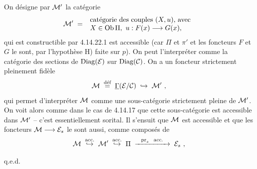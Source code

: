 
On désigne par $\mathcal{M}'$ la catégorie
\[
\mathcal{M}' \;=\;
\begin{array}{l}
\text{catégorie des couples } (X,u)\text{, avec}\\
X \in \operatorname{Ob}\Pi,\ u : F(x) \longrightarrow G(x),
\end{array}
\] %
qui est constructible par 4.14.22.1 est accessible (car $\Pi$ et $\pi'$ et les foncteurs $F$ et $G$ le sont, par l'hypothèse H) faite sur $p$). On peut l'interpréter comme la catégorie des sections %
de $\mathrm{Diag}(\mathcal{E})$ sur $\mathrm{Diag}(\mathcal{C})$. On a un foncteur strictement pleinement fidèle
\[
\cM \;\defeq\; \underline{\Gamma}(\cE/\cC) \;\hookrightarrow\; \cM'\ ,
\]
qui permet d'interpréter $\mathcal{M}$ comme une sous-catégorie strictement pleine de $\mathcal{M}'$. On voit alors comme dans le cas de 4.14.17 que cette sous-catégorie est accessible dans $\mathcal{M}'$ -- c'est essentiellement sorital. Il s'ensuit que $\mathcal{M}$ est accessible et que les foncteurs $\mathcal{M} \longrightarrow \mathcal{E}_s$ le sont aussi, comme composés de
\[
\mathcal{M} \;\overset{\text{\upshape acc.}}{\hookrightarrow}\; \mathcal{M}' \;\overset{\text{\upshape acc.}}{\hookrightarrow}\; \Pi \;\xrightarrow{\ \ \mathrm{pr}_s\ \ \text{\upshape acc.}\ \ }\; \mathcal{E}_s\ ,
\]

\hfill q.e.d.



